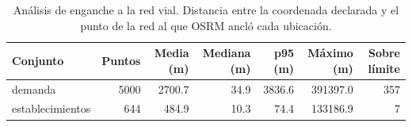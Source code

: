 \begin{table}[htbp]
\caption{Análisis de enganche a la red vial. Distancia entre la coordenada declarada y el punto de la red al que OSRM ancló cada ubicación.}
\label{tab:snapping}
\footnotesize
\begin{tabular}{lrrrrrr}
\toprule
Conjunto & Puntos & Media (m) & Mediana (m) & p95 (m) & Máximo (m) & Sobre límite \\
\midrule
demanda & 5000 & 2700.7 & 34.9 & 3836.6 & 391397.0 & 357 \\
establecimientos & 644 & 484.9 & 10.3 & 74.4 & 133186.9 & 7 \\
\bottomrule
\end{tabular}
\end{table}
